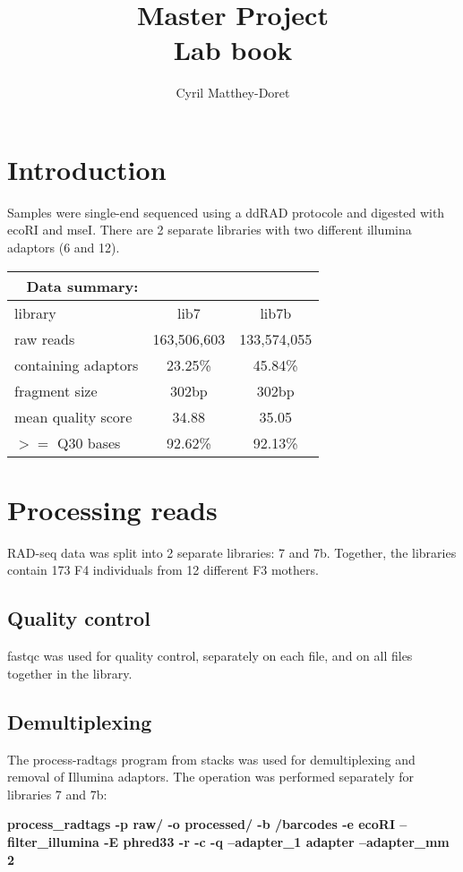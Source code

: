 \documentclass[10pt,a4paper]{report}
\author{Cyril Matthey-Doret}
\begin{document}
 \title{\textbf{Master Project}\\ Lab book}
 \maketitle
 \chapter{Introduction}
Samples were single-end sequenced using a ddRAD protocole and digested with ecoRI and mseI. There are 2 separate libraries with two different illumina adaptors (6 and 12). 

\begin{center}
\begin{tabular}{l| c c}
 \multicolumn{1}{r}{Data summary:} \\
 \hline
library & lib7 & lib7b \\
raw reads & 163,506,603 & 133,574,055 \\
containing adaptors & 23.25\% & 45.84\% \\
fragment size & 302bp & 302bp \\
mean quality score & 34.88 & 35.05 \\
$>=$ Q30 bases & 92.62\% & 92.13\% \\
\end{tabular}
\end{center}
 \chapter{Processing reads}
 RAD-seq data was split into 2 separate libraries: 7 and 7b. Together, the libraries contain 173 F4 individuals from 12 different F3 mothers. 
 \section{Quality control}
 fastqc was used for quality control, separately on each file, and on all files together in the library.
 \section{Demultiplexing}
 The process-radtags program from stacks was used for demultiplexing and removal of Illumina adaptors. The operation was performed separately for libraries 7 and 7b:

\noindent \textbf{process\_radtags -p raw/ -o processed/ -b /barcodes -e ecoRI --filter\_illumina -E phred33 -r -c -q --adapter\_1 adapter --adapter\_mm 2}
\end{document}
